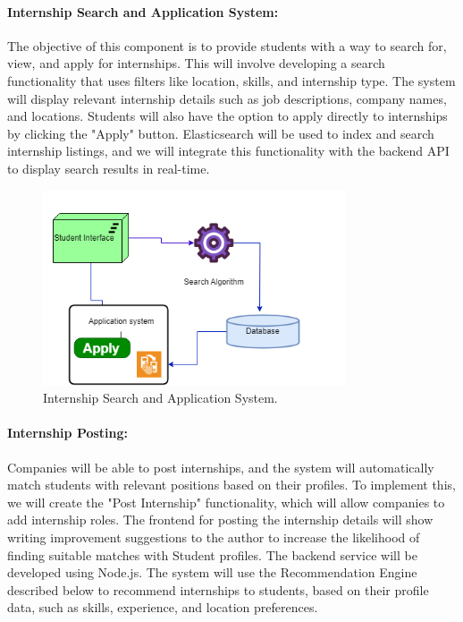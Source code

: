 \paragraph{Internship Search and Application System:}
The objective of this component is to provide students with a way to search for, view, and apply for internships. This will involve developing a search functionality that uses filters like location, skills, and internship type. The system will display relevant internship details such as job descriptions, company names, and locations. Students will also have the option to apply directly to internships by clicking the "Apply" button. Elasticsearch will be used to index and search internship listings, and we will integrate this functionality with the backend API to display search results in real-time.

\begin{figure}[H]
\centering
\includegraphics[width=0.8\textwidth]{Images/core2.png}
\caption{Internship Search and Application System.}
\end{figure}

\paragraph{Internship Posting:}
Companies will be able to post internships, and the system will automatically match students with relevant positions based on their profiles. To implement this, we will create the "Post Internship" functionality, which will allow companies to add internship roles. The frontend for posting the internship details will show writing improvement suggestions to the author to increase the likelihood of finding suitable matches with Student profiles. The backend service will be developed using Node.js.
The system will use the Recommendation Engine described below to recommend internships to students, based on their profile data, such as skills, experience, and location preferences.

